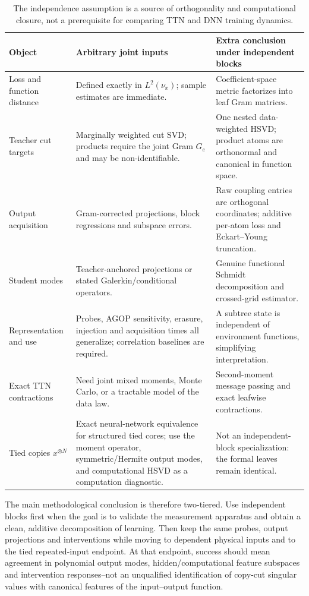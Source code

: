 \begin{table}[t]
\centering
\small
\renewcommand{\arraystretch}{1.2}
\begin{tabular}{p{}p{}p{}}
\hline
\raggedright Object & \raggedright Arbitrary joint inputs & \raggedright Extra conclusion under independent blocks \tabularnewline
\hline
\raggedright Loss and function distance
& \raggedright Defined exactly in $L^2(\nu_x)$; sample estimates are immediate.
& \raggedright Coefficient-space metric factorizes into leaf Gram matrices. \tabularnewline
\raggedright Teacher cut targets
& \raggedright Marginally weighted cut SVD; products require the joint Gram $G_e$ and may be non-identifiable.
& \raggedright One nested data-weighted HSVD; product atoms are orthonormal and canonical in function space. \tabularnewline
\raggedright Output acquisition
& \raggedright Gram-corrected projections, block regressions and subspace errors.
& \raggedright Raw coupling entries are orthogonal coordinates; additive per-atom loss and Eckart--Young truncation. \tabularnewline
\raggedright Student modes
& \raggedright Teacher-anchored projections or stated Galerkin/conditional operators.
& \raggedright Genuine functional Schmidt decomposition and crossed-grid estimator. \tabularnewline
\raggedright Representation and use
& \raggedright Probes, AGOP sensitivity, erasure, injection and acquisition times all generalize; correlation baselines are required.
& \raggedright A subtree state is independent of environment functions, simplifying interpretation. \tabularnewline
\raggedright Exact TTN contractions
& \raggedright Need joint mixed moments, Monte Carlo, or a tractable model of the data law.
& \raggedright Second-moment message passing and exact leafwise contractions. \tabularnewline
\raggedright Tied copies $x^{\otimes N}$
& \raggedright Exact neural-network equivalence for structured tied cores; use the moment operator, symmetric/Hermite output modes, and computational HSVD as a computation diagnostic.
& \raggedright Not an independent-block specialization: the formal leaves remain identical. \tabularnewline
\hline
\end{tabular}
\caption{The independence assumption is a source of orthogonality and computational closure, not a prerequisite for comparing TTN and DNN training dynamics.}
\label{tab:evidence}
\end{table}

The main methodological conclusion is therefore two-tiered.  Use independent blocks first when the
goal is to validate the measurement apparatus and obtain a clean, additive decomposition of learning.
Then keep the same probes, output projections and interventions while moving to dependent physical
inputs and to the tied repeated-input endpoint.  At that endpoint, success should mean agreement in
polynomial output modes, hidden/computational feature subspaces and intervention responses--not an
unqualified identification of copy-cut singular values with canonical features of the input--output
function.

